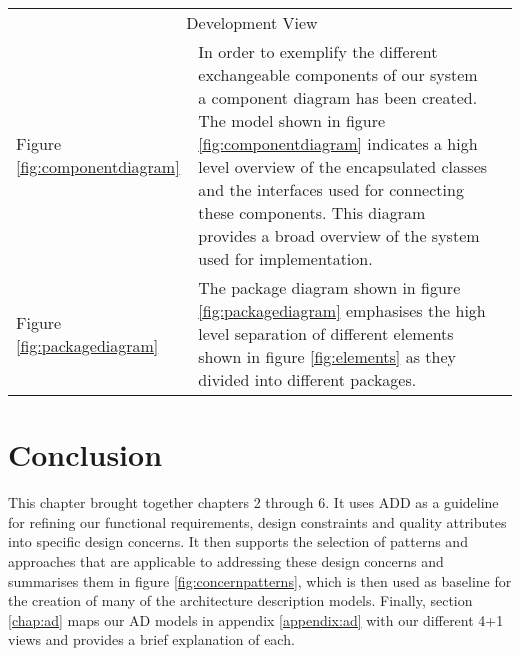 \begin{table}[htp]
\centering
\begin{tabularx}{\textwidth}{lXl}
\cline{1-2}
\multicolumn{2}{|c|}{\cellcolor[HTML]{EFEFEF}Development View} &  \\ \cline{1-2}
\multicolumn{1}{|l|}{Figure \ref{fig:componentdiagram}} & \multicolumn{1}{X|}{In order to exemplify the different exchangeable components of our system a component diagram has been created. The model shown in figure \ref{fig:componentdiagram} indicates a high level overview of the encapsulated classes and the interfaces used for connecting these components. This diagram provides a broad overview of the system used for implementation.} &  \\ \cline{1-2}
\multicolumn{1}{|l|}{Figure \ref{fig:packagediagram}} & \multicolumn{1}{X|}{The package diagram shown in figure \ref{fig:packagediagram} emphasises the high level separation of different elements shown in figure \ref{fig:elements} as they divided into different packages.} &  \\ \cline{1-2}
\end{tabularx}
\label{tab:developmentview}
\end{table}


\section{Conclusion}
This chapter brought together chapters 2 through 6. It uses ADD as a guideline for refining our functional requirements, design constraints and quality attributes into specific design concerns. It then supports the selection of patterns and approaches that are applicable to addressing these design concerns and summarises them in figure \ref{fig:concernpatterns}, which is then used as baseline for the creation of many of the architecture description models. Finally, section \ref{chap:ad} maps our AD models in appendix \ref{appendix:ad} with our different 4+1 views and provides a brief explanation of each. 
